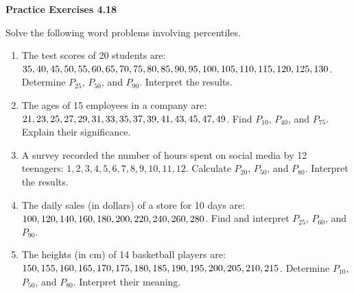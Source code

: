 \vspace{0.3ex}
\noindent\textbf{Practice Exercises 4.18}

\vspace{0.2ex}

Solve the following word problems involving percentiles.  

\begin{enumerate}
    \item The test scores of 20 students are: \(35, 40, 45, 50, 55, 60, 65, 70, 75, 80, 85,\\ 90, 95, 100, 105, 110, 115, 120, 125, 130\). Determine \(P_{25}\), \(P_{50}\), and \(P_{90}\). Interpret the results.  
    \item The ages of 15 employees in a company are: \(21, 23, 25, 27, 29, 31, 33, 35,\\ 37, 39, 41, 43, 45, 47, 49\). Find \(P_{10}\), \(P_{40}\), and \(P_{75}\). Explain their significance.  
    \item A survey recorded the number of hours spent on social media by 12\\ teenagers: \(1, 2, 3, 4, 5, 6, 7, 8, 9, 10, 11, 12\). Calculate \(P_{20}\), \(P_{50}\), and \(P_{80}\). Interpret the results.  
    \item The daily sales (in dollars) of a store for 10 days are: \(100, 120, 140, 160,\\ 180, 200, 220, 240, 260, 280\). Find and interpret \(P_{25}\), \(P_{60}\), and \(P_{90}\). 
    \item The heights (in cm) of 14 basketball players are: \(150, 155, 160, 165, 170,\\ 175, 180, 185, 190, 195, 200, 205, 210, 215\). Determine \(P_{10}\), \(P_{50}\), and \(P_{80}\). Interpret their meaning.  
\end{enumerate}
